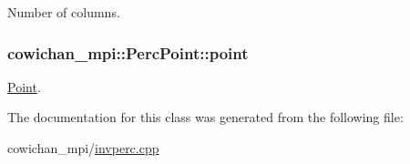 Number of columns. \hypertarget{classcowichan__mpi_1_1_perc_point_2511cf8b976a0a1a0049eaf36848fd32}{
\subsubsection[{point}]{ {\bf cowichan\_\-mpi::PercPoint::point}}}
\label{classcowichan__mpi_1_1_perc_point_2511cf8b976a0a1a0049eaf36848fd32}


\hyperlink{class_point}{Point}. 

The documentation for this class was generated from the following file:\begin{CompactItemize}
\item 
cowichan\_\-mpi/\hyperlink{cowichan__mpi_2invperc_8cpp}{invperc.cpp}\end{CompactItemize}
